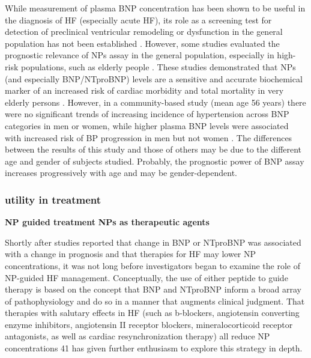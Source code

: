 \documentclass[14pt,a4paper,onecolumn]{extarticle}
\begin{document}
While measurement of plasma BNP concentration has been shown to be useful in the diagnosis of HF (especially acute HF), its role as a screening test for detection of preclinical ventricular remodeling or dysfunction in the general population has not been established \citep{bib35} \citep{bib3246} \citep{bib3247}. However, some studies evaluated the prognostic relevance of NPs assay in the general population, especially in high-risk populations, such as elderly people \citep{bib316} \citep{bib3187} \citep{bib3224} \citep{bib3244} \citep{bib3245} \citep{bib3246} \citep{bib3247} \citep{bib3248}. These studies demonstrated that NPs (and especially BNP/NTproBNP) levels are a sensitive and accurate biochemical marker of an increased risk of cardiac morbidity and total mortality in very elderly persons \citep{bib316} \citep{bib3147} \citep{bib3188} \citep{bib3227} \citep{bib3248} \citep{bib3249}. However, in a community-based study (mean age 56 years) there were no significant trends of increasing incidence of hypertension across BNP categories in men or women, while higher plasma BNP levels were associated with increased risk of BP progression in men but not women \citep{bib3250}. The differences between the results of this study \citep{bib3250} and those of others \citep{bib316} \citep{bib3185} \citep{bib3227} \citep{bib3248} \citep{bib3249} may be due to the different age and gender of subjects studied. Probably, the prognostic power of BNP assay increases progressively with age and may be gender-dependent.

\clearpage
\subsubsection{utility in treatment}
	\textbf{NP guided treatment}
	\textbf{NPs as therapeutic agents}

Shortly after studies reported that change in BNP or NTproBNP was associated with a change in prognosis and that therapies for HF may lower NP concentrations, it was not long before investigators began to examine the role of NP-guided HF management. Conceptually, the use of either peptide to guide therapy is based on the concept that BNP and NTproBNP inform a broad array of pathophysiology and do so in a manner that augments clinical judgment. That therapies with salutary effects in HF (such as b-blockers, angiotensin converting enzyme inhibitors, angiotensin II receptor blockers, mineralocorticoid receptor antagonists, as well as cardiac resynchronization therapy) all reduce NP concentrations 41 has given further enthusiasm to explore this strategy in depth. \citep{Gaggin2013}
\end{document}
